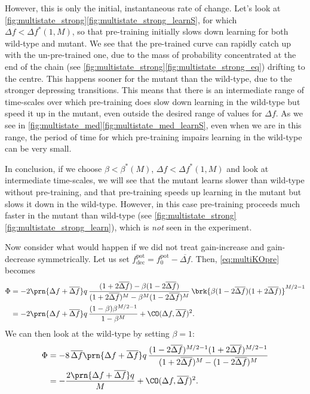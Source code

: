 \documentclass[12pt]{article}
\newcommand{\pot}{^{\text{pot}}}
\newcommand{\norm}{_0}
\newcommand{\dec}{_{\text{dec}}}
\begin{document}
However, this is only the initial, instantaneous rate of change.
Let's look at \autoref{fig:multistate_strong}\ref{fig:multistate_strong_learnS}, for which $\Delta f < \Delta f^*(1,M)$, so that pre-training initially slows down learning for both wild-type and mutant.
We see that the pre-trained curve can rapidly catch up with the un-pre-trained one, due to the mass of probability concentrated at the end of the chain (see \autoref{fig:multistate_strong}\ref{fig:multistate_strong_eq}) drifting to the centre.
This happens sooner for the mutant than the wild-type, due to the stronger depressing transitions.
This means that there is an intermediate range of time-scales over which pre-training does slow down learning in the wild-type but speed it up in the mutant, even outside the desired range of values for $\Delta f$.
As we see in \autoref{fig:multistate_med}\ref{fig:multistate_med_learnS}, even when we are in this range, the period of time for which pre-training impairs learning in the wild-type can be very small.

In conclusion, if we choose $\beta<\beta^*(M)$, $\Delta f < \Delta f^*(1,M)$ and look at intermediate time-scales, we will see that the mutant learns slower than wild-type without pre-training, and that pre-training speeds up learning in the mutant but slows it down in the wild-type.
However, in this case pre-training proceeds much faster in the mutant than wild-type (see \autoref{fig:multistate_strong}\ref{fig:multistate_strong_learn}), which is \emph{not} seen in the experiment.

Now consider what would happen if we did not treat gain-increase and gain-decrease symmetrically.
Let us set $f\pot\dec = f\pot\norm - \overline{\Delta f}$.
Then, \eqref{eq:multiKOpre} becomes
%
\begin{equation}\label{eq:multiKOdiffpre}
\begin{aligned}
  \Phi &= -2\prn{\Delta f + \overline{\Delta f}} q \, \frac{(1+2\overline{\Delta f}) - \beta(1-2\overline{\Delta f})}
          {(1+2\overline{\Delta f})^M - \beta^M(1-2\overline{\Delta f})^M}   \,
          \brk{\beta (1-2\overline{\Delta f}) (1+2\overline{\Delta f})}^{M/2-1} \\
       &= -2\prn{\Delta f + \overline{\Delta f}} q\,\frac{(1-\beta)\beta^{M/2-1}}{1-\beta^M} + \CO(\Delta f,\overline{\Delta f})^2.
\end{aligned}
\end{equation}
%
We can then look at the wild-type by setting $\beta=1$:
%
\begin{equation}\label{eq:multiWTdiffpre}
\begin{aligned}
  \Phi &= -8\,\overline{\Delta f}\prn{\Delta f + \overline{\Delta f}} q \,
          \frac{(1-2\overline{\Delta f})^{M/2-1} (1+2\overline{\Delta f})^{M/2-1} }
          {(1+2\overline{\Delta f})^M - (1-2\overline{\Delta f})^M}   \\
       &= -\frac{2\prn{\Delta f + \overline{\Delta f}} q}{M} + \CO(\Delta f,\overline{\Delta f})^2.
\end{aligned}
\end{equation}
%
\end{document}
